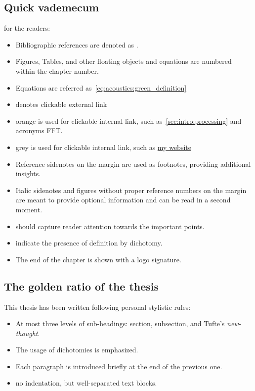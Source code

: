 \subsection{Quick vademecum} for the readers:
\begin{itemize}
    \item Bibliographic references are denoted as .
    \item Figures, Tables, and other floating objects and equations are numbered within the chapter number.
    \item Equations are referred as~\cref{eq:acoustics:green_definition}
    \item \ExternalLink denotes clickable external link
    \item \textcolor{myorange}{orange} is used for clickable internal link, such as~\cref{sec:intro:processing} and acronyms \acs{FFT}.
    \item \textcolor{mygray}{grey} is used for clickable internal link, such as \href{www.diegodicarlo.com}{my website\ExternalLink}
    \item Reference sidenotes on the margin are used as footnotes, providing additional insights.
    \item Italic sidenotes and figures without proper reference numbers on the margin are meant to provide optional information and can be read in a second moment.
    \item \textcolor{black!30}{\scriptsize\raisebox{1pt}{$\blacktriangleright$}} should capture reader attention towards the important points.
    \item \textcolor{black!30}{\scriptsize\raisebox{1pt}{$\rightleftarrows$}} indicate the presence of definition by dichotomy.
    \item The end of the chapter is shown with a logo signature.
\end{itemize}

\subsection{The golden ratio of the thesis}
This thesis has been written following personal stylistic rules:
\begin{itemize}
    \item At most three levels of sub-headings: section, subsection, and Tufte's \textit{new-thought}.
    \item The usage of dichotomies is emphasized.
    \item Each paragraph is introduced briefly at the end of the previous one.
    \item no indentation, but well-separated text blocks.
\end{itemize}